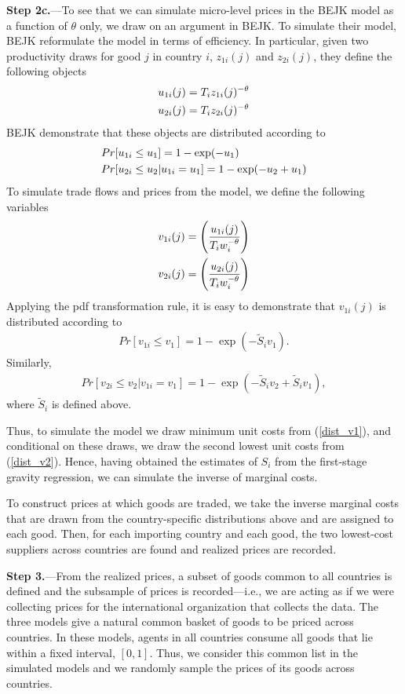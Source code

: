 \documentclass[12pt,dvips, ps2pdf]{article}
\begin{document}
\textbf{Step 2c.}---To see that we can simulate micro-level prices in the BEJK model as a function of $\theta$ only, we draw on an argument in BEJK. To simulate their model, BEJK reformulate the model in terms of efficiency. In particular, given two productivity draws for good $j$ in country $i$, $z_{1i}(j)$ and $z_{2i}(j)$, they define the following objects
\begin{align}
u_{1i}(j)=T_iz_{1i}(j)^{-\theta}\notag\\
u_{2i}(j)=T_iz_{2i}(j)^{-\theta}\notag
\end{align}
BEJK demonstrate that these objects are distributed according to
\begin{align}
&Pr[u_{1i}\leq u_1]=1-\exp(-u_1)\notag\\
&Pr[u_{2i}\leq u_2|u_{1i}=u_1]=1-\exp(-u_2+u_1)\notag
\end{align}
To simulate trade flows and prices from the model, we define the following variables
\begin{align}
v_{1i}(j)=\left(\frac{u_{1i}(j)}{T_iw_i^{-\theta}}\right)\notag\\
v_{2i}(j)=\left(\frac{u_{2i}(j)}{T_iw_i^{-\theta}}\right)\notag
\end{align}
Applying the pdf transformation rule, it is easy to demonstrate that $v_{1i}(j)$ is distributed according to
\begin{align}
\label{dist_v1}
Pr[v_{1i}\leq v_1]=1-\exp(-\tilde S_i v_1).
\end{align}
Similarly,
\begin{align}
\label{dist_v2}
Pr[v_{2i}\leq v_2|v_{1i}=v_1]=1-\exp(-\tilde S_i v_2+\tilde S_i v_1),
\end{align}
where $\tilde S_i$ is defined above.

Thus, to simulate the model we draw minimum unit costs from (\ref{dist_v1}), and conditional on these draws, we draw the second lowest unit costs from (\ref{dist_v2}). Hence, having obtained the estimates of $S_i$ from the first-stage gravity regression, we can simulate the inverse of marginal costs.

To construct prices at which goods are traded, we take the inverse marginal costs that are drawn from the country-specific distributions above and are assigned to each good. Then, for each importing country and each good, the two lowest-cost suppliers across countries are found and realized prices are recorded.

\textbf{Step 3.}---From the realized prices, a subset of goods common to all countries is defined and the subsample of prices is recorded---i.e., we are acting as if we were collecting prices for the international organization that collects the data. The three models give a natural common basket of goods to be priced across countries. In these models, agents in all countries consume all goods that lie within a fixed interval, $[0,1]$. Thus, we consider this common list in the simulated models and we randomly sample the prices of its goods across countries.
\end{document}
